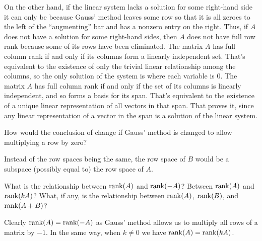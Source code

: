 \begin{exercises}
\begin{answer}
\begin{exparts}
          On the other hand, if the linear system lacks a solution for some
          right-hand side it can only be because Gauss' method leaves some row
          so that it is all zeroes to the left of the ``augmenting'' bar 
          and has a nonzero entry on the right.
          Thus, if $A$ does not have a solution for some right-hand sides,
          then \( A \) does not have full row rank because some of its rows
          have been eliminated.
        \partsitem The matrix \( A \) has full column rank if and only
          if its columns
          form a linearly independent set.
          That's equivalent to the existence of only the trivial linear
          relationship among the columns, so the only solution of the
          system is where each variable is $0$.
        \partsitem The matrix \( A \) has full column rank if and only
          if the set of
          its columns is linearly independent, and so forms a basis for
          its span.
          That's equivalent to the existence of a unique linear representation
          of all vectors in that span.
          That proves it, 
          since any linear representation of a vector in the span is a 
          solution of the linear system.
      \end{exparts}  
    \end{answer}
  \item 
    How would the conclusion of  change
    if Gauss' method is changed to allow multiplying a row by zero?
    \begin{answer}
      Instead of the row spaces being the same, the row space of $B$
      would be a subspace (possibly equal to) the row space of $A$.
    \end{answer}
  \recommended \item
    What is the relationship between \( \operatorname{rank}(A) \) and \( \operatorname{rank}(-A) \)?
    Between \( \operatorname{rank}(A) \) and \( \operatorname{rank}(kA) \)?
    What, if any, is the relationship between \( \operatorname{rank}(A) \), \( \operatorname{rank}(B) \),
    and \( \operatorname{rank}(A+B) \)?
    \begin{answer}
      Clearly \( \operatorname{rank}(A)=\operatorname{rank}(-A) \) as Gauss' method allows us to
      multiply all rows of a matrix by \( -1 \).
      In the same way, when \( k\neq 0 \) we have \( \operatorname{rank}(A)=\operatorname{rank}(kA) \).


\end{answer}
\end{exercises}
